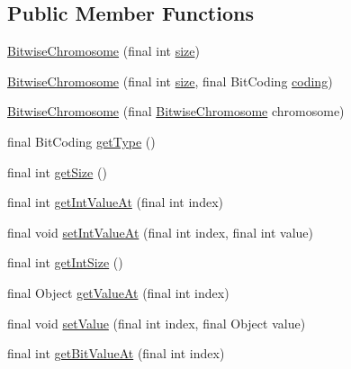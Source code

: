 \subsection*{Public Member Functions}
\begin{DoxyCompactItemize}
\item 
\hyperlink{classjenes_1_1chromosome_1_1_bitwise_chromosome_a87547c87419943bded51820cbc1ae830}{Bitwise\-Chromosome} (final int \hyperlink{classjenes_1_1chromosome_1_1_bitwise_chromosome_a87b8652220ca81cad899a13e341bf954}{size})
\item 
\hyperlink{classjenes_1_1chromosome_1_1_bitwise_chromosome_a9109a8205e447db9032f29494f0d9b3d}{Bitwise\-Chromosome} (final int \hyperlink{classjenes_1_1chromosome_1_1_bitwise_chromosome_a87b8652220ca81cad899a13e341bf954}{size}, final Bit\-Coding \hyperlink{classjenes_1_1chromosome_1_1_bitwise_chromosome_aaca5e98844bcc938fecc81b959a63c03}{coding})
\item 
\hyperlink{classjenes_1_1chromosome_1_1_bitwise_chromosome_a90798d86b6c1871c441b562e0b1d50ca}{Bitwise\-Chromosome} (final \hyperlink{classjenes_1_1chromosome_1_1_bitwise_chromosome}{Bitwise\-Chromosome} chromosome)
\item 
final Bit\-Coding \hyperlink{classjenes_1_1chromosome_1_1_bitwise_chromosome_a905b92cd6dc14db9d2b9276f1a6686e9}{get\-Type} ()
\item 
final int \hyperlink{classjenes_1_1chromosome_1_1_bitwise_chromosome_ae59ae8f495ec9d5aa15712cee7c0b313}{get\-Size} ()
\item 
final int \hyperlink{classjenes_1_1chromosome_1_1_bitwise_chromosome_af817cb2110fc6b8d415e46377ddd4911}{get\-Int\-Value\-At} (final int index)
\item 
final void \hyperlink{classjenes_1_1chromosome_1_1_bitwise_chromosome_a3cbcf428333a0dc4209ce2c820054542}{set\-Int\-Value\-At} (final int index, final int value)
\item 
final int \hyperlink{classjenes_1_1chromosome_1_1_bitwise_chromosome_a36e6b8c849d563a359245763116667d5}{get\-Int\-Size} ()
\item 
final Object \hyperlink{classjenes_1_1chromosome_1_1_bitwise_chromosome_a3061d34e1f0c0faa915d4da7ea2f615c}{get\-Value\-At} (final int index)
\item 
final void \hyperlink{classjenes_1_1chromosome_1_1_bitwise_chromosome_aaa42be8f0c26735e8a8d603d9b743b6a}{set\-Value} (final int index, final Object value)
\item 
final int \hyperlink{classjenes_1_1chromosome_1_1_bitwise_chromosome_a05ce80f3729d007c5d550eef5969ac86}{get\-Bit\-Value\-At} (final int index)

\end{DoxyCompactItemize}
